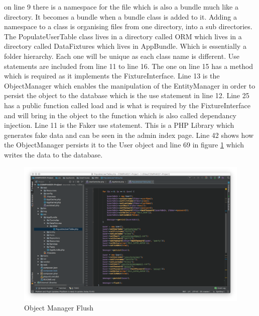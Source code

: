 on line 9 there is a namespace for the file which is also a bundle much like a directory.  It becomes a bundle when a bundle class is added to it. Adding a namespace to a class is organising files from one directory, into a sub directories. The PopulateUserTable class lives in a directory called ORM which lives in a directory called DataFixtures which lives in AppBundle. Which is essentially a folder hierarchy. Each one will be unique as each class name is different. Use statements are included from line 11 to line 16. The one on line 15 has a method which is required as it implements the FixtureInterface. Line 13 is the ObjectManager which enables the manipulation of the EntityManager in order to persist the object to the database which is the use statement in line 12. Line 25 has a public function called load and is what is required by the FixtureInterface and will bring in the object to the function which is also called dependancy injection. Line 11 is the Faker use statement. This is a PHP Library which generates fake data and can be seen in the admin index page. Line 42 shows how the ObjectManager persists it to the User object and line 69 in figure \ref{fig:Object Manager Flush} which writes the data to the database.

\begin{figure}[htbp]
   \centering
   \includegraphics[width=400pt]{figures/objectmanager_flush.png} %
   \caption{Object Manager Flush}
   \label{fig:Object Manager Flush}
\end{figure}

